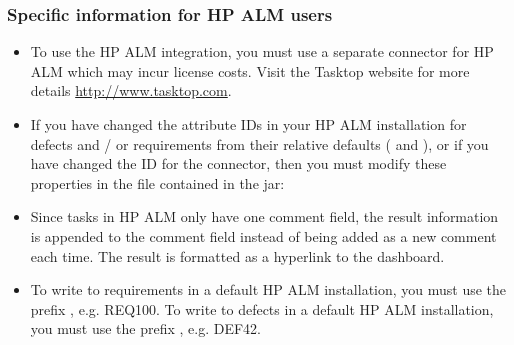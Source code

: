 
\subsubsection{Specific information for HP ALM users}
\begin{itemize}
\item To use the HP ALM integration, you must use a separate connector for HP ALM which may incur license costs. Visit the Tasktop website for more details \url{http://www.tasktop.com}.
\item If you have changed the attribute IDs in your HP ALM installation for defects and / or requirements from their relative defaults ( and ), or if you have changed the ID for the connector, then you must modify these properties in the  file contained in the jar:\\
\item Since tasks in HP ALM only have one comment field, the result information is appended to the comment field instead of being added as a new comment each time. The result is formatted as a hyperlink to the dashboard.
\item To write to requirements in a default HP ALM installation, you must use the prefix , e.g. REQ100. To write to defects in a default HP ALM installation, you must use the prefix , e.g. DEF42.
\end{itemize}


